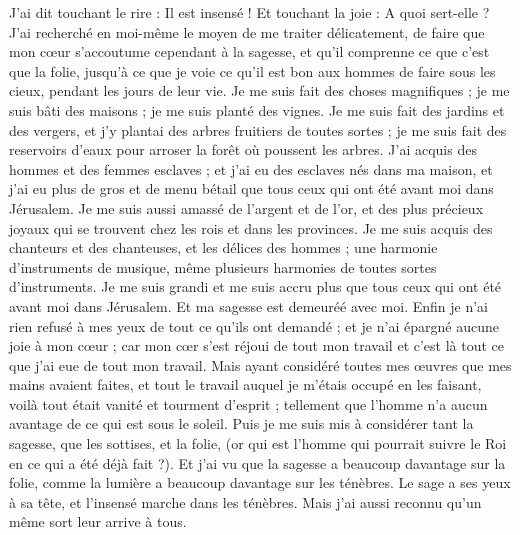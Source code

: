 \begin{multicols}{2}
J'ai dit touchant le rire : Il est insensé ! Et touchant la joie : A quoi sert-elle ?
J'ai recherché en moi-même le moyen de me traiter délicatement, de faire que mon cœur s'accoutume cependant à la sagesse, et qu'il comprenne ce que c'est que la folie, jusqu’à ce que je voie ce qu'il est bon aux hommes de faire sous les cieux, pendant les jours de leur vie. 
Je me suis fait des choses magnifiques ; je me suis bâti des maisons ; je me suis planté des vignes.
Je me suis fait des jardins et des vergers, et j'y plantai des arbres fruitiers de toutes sortes ;
je me suis fait des reservoirs d'eaux pour arroser la forêt où poussent les arbres.
J'ai acquis des hommes et des femmes esclaves ; et j'ai eu des esclaves nés dans ma maison, et j'ai eu plus de gros et de menu bétail que tous ceux qui ont été avant moi dans Jérusalem. 
Je me suis aussi amassé de l'argent et de l'or, et des plus précieux joyaux qui se trouvent chez les rois et dans les provinces. Je me suis acquis des chanteurs et des chanteuses, et les délices des hommes ; une harmonie d'instruments de musique, même plusieurs harmonies de toutes sortes d'instruments. 
Je me suis grandi et me suis accru plus que tous ceux qui ont été avant moi dans Jérusalem. Et ma sagesse est demeuréé avec moi.
Enfin je n'ai rien refusé à mes yeux de tout ce qu'ils ont demandé ; et je n'ai épargné aucune joie à mon cœur ; car mon cœr s'est réjoui de tout mon travail et c'est là tout ce que j'ai eue de tout mon travail.
Mais ayant considéré toutes mes œuvres que mes mains avaient faites, et tout le travail auquel je m'étais occupé en les faisant, voilà tout était vanité et tourment d'esprit ; tellement que l'homme n'a aucun avantage de ce qui est sous le soleil.
Puis je me suis mis à considérer tant la sagesse, que les sottises, et la folie, (or qui est l'homme qui pourrait suivre le Roi en ce qui a été déjà fait ?).
Et j'ai vu que la sagesse a beaucoup davantage sur la folie, comme la lumière a beaucoup davantage sur les ténèbres.
Le sage a ses yeux à sa tête, et l'insensé marche dans les ténèbres. Mais j'ai aussi reconnu qu'un même sort leur arrive à tous.

\end{multicols}
